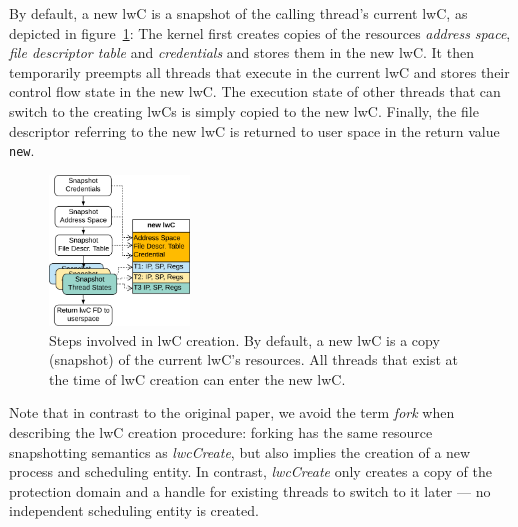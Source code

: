 \documentclass[10pt,twocolumn,letter]{article}
\begin{document}
By default, a new lwC is a snapshot of the calling thread's current lwC, as depicted in figure~\ref{design:fig:lwccreationsequencediagram}:
The kernel first creates copies of the resources \textit{address space}, \textit{file descriptor table} and \textit{credentials} and stores them in the new lwC.
It then temporarily preempts all threads that execute in the current lwC and stores their control flow state in the new lwC.
The execution state of other threads that can switch to the creating lwCs is simply copied to the new lwC.
Finally, the file descriptor referring to the new lwC is returned to user space in the return value \lstinline{new}.

\begin{figure}
  \centering
  \includegraphics[height=4cm]{fig/lwc-creation-sequence-diagram}
  \caption{
    Steps involved in lwC creation.
    By default, a new lwC is a copy (snapshot) of the current lwC's resources.
    All threads that exist at the time of lwC creation can enter the new lwC.
  }
\label{design:fig:lwccreationsequencediagram}
\end{figure}

Note that in contrast to the original paper, we avoid the term \textit{fork} when describing the lwC creation procedure:
forking has the same resource snapshotting semantics as \textit{lwcCreate}, but also implies the creation of a new process and scheduling entity.
In contrast, \textit{lwcCreate} only creates a copy of the protection domain and a handle for existing threads to switch to it later --- no independent scheduling entity is created.
\end{document}

